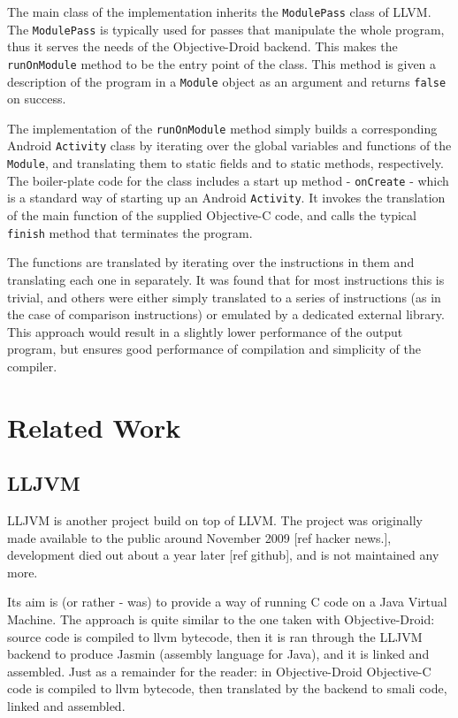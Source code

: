 \documentclass[parskip]{cs4rep}
\begin{document}
The main class of the implementation inherits the {\tt ModulePass} class of LLVM. The {\tt ModulePass} is typically used for passes that manipulate the whole program, thus it serves the needs of the Objective-Droid backend. This makes the {\tt runOnModule} method to be the entry point of the class. This method is given a description of the program in a {\tt Module} object as an argument and returns {\tt false} on success.

The implementation of the {\tt runOnModule} method simply builds a corresponding Android {\tt Activity} class by iterating over the global variables and functions of the {\tt Module}, and translating them to static fields and to static methods, respectively. The boiler-plate code for the class includes a start up method - {\tt onCreate} - which is a standard way of starting up an Android {\tt Activity}. It invokes the translation of the main function of the supplied Objective-C code, and calls the typical {\tt finish} method that terminates the program.

The functions are translated by iterating over the instructions in them and translating each one in separately. It was found that for most instructions this is trivial, and others were either simply translated to a series of instructions (as in the case of comparison instructions) or emulated by a dedicated external library. This approach would result in a slightly lower performance of the output program, but ensures good performance of compilation and simplicity of the compiler.

\chapter{Related Work}

\section{LLJVM}

LLJVM is another project build on top of LLVM. The project was originally made available to the public around November 2009 [ref hacker news.], development died out about a year later [ref github], and is not maintained any more.

Its aim is (or rather - was) to provide a way of running C code on a Java Virtual Machine. The approach is quite similar to the one taken with Objective-Droid: source code is compiled to llvm bytecode, then it is ran through the LLJVM backend to produce Jasmin (assembly language for Java), and it is linked and assembled. Just as a remainder for the reader: in Objective-Droid Objective-C code is compiled to llvm bytecode, then translated by the backend to smali code, linked and assembled.
\end{document}
